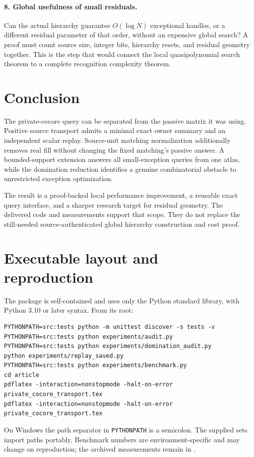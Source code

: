 \documentclass[11pt,letterpaper]{article}
\theoremstyle{definition}
\begin{document}
\paragraph{8. Global usefulness of small residuals.}
Can the actual hierarchy guarantee $O(\log N)$ exceptional handles, or a different residual parameter of that order, without an expensive global search? A proof must count source size, integer bits, hierarchy resets, and residual geometry together. This is the step that would connect the local quasipolynomial search theorem to a complete recognition complexity theorem.

\section{Conclusion}
The private-cocore query can be separated from the passive matrix it was using. Positive source transport admits a minimal exact owner summary and an independent scalar replay. Source-unit matching normalization additionally removes real fill without changing the fixed matching's passive answer. A bounded-support extension answers all small-exception queries from one atlas, while the domination reduction identifies a genuine combinatorial obstacle to unrestricted exception optimization.

The result is a proof-backed local performance improvement, a reusable exact query interface, and a sharper research target for residual geometry. The delivered code and measurements support that scope. They do not replace the still-needed source-authenticated global hierarchy construction and cost proof.

\appendix
\section{Executable layout and reproduction}
The package is self-contained and uses only the Python standard library, with Python 3.10 or later syntax. From its root:
\begin{lstlisting}
PYTHONPATH=src:tests python -m unittest discover -s tests -v
PYTHONPATH=src:tests python experiments/audit.py
PYTHONPATH=src:tests python experiments/domination_audit.py
python experiments/replay_saved.py
PYTHONPATH=src:tests python experiments/benchmark.py
cd article
pdflatex -interaction=nonstopmode -halt-on-error private_cocore_transport.tex
pdflatex -interaction=nonstopmode -halt-on-error private_cocore_transport.tex
\end{lstlisting}
On Windows the path separator in \texttt{PYTHONPATH} is a semicolon. The supplied  sets import paths portably. Benchmark numbers are environment-specific and may change on reproduction; the archived measurements remain in .
\end{document}

